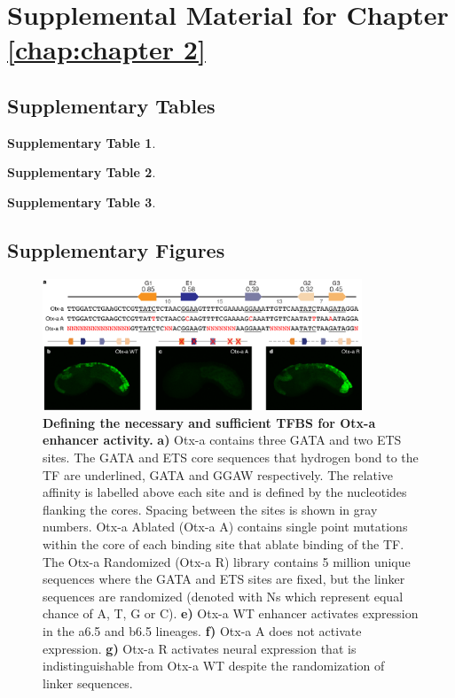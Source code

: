 \chapter{Supplemental Material for Chapter \ref{chap:chapter 2}}

\section{Supplementary Tables}

\noindent
\textbf{Supplementary Table 1}.

\noindent
\textbf{Supplementary Table 2}.

\noindent
\textbf{Supplementary Table 3}.

\section{Supplementary Figures}

\begin{figure}[p]
    \centering
    \includegraphics[width=0.85\textwidth]{2_figures-and-files/SuppFig1.png}
    \caption[Defining the necessary and sufficient TFBS for Otx-a enhancer activity.]{\textbf{Defining the necessary and sufficient TFBS for Otx-a enhancer activity.} \textbf{a)} Otx-a contains three GATA and two ETS sites. The GATA and ETS core sequences that hydrogen bond to the TF are underlined, GATA and GGAW respectively. The relative affinity is labelled above each site and is defined by the nucleotides flanking the cores. Spacing between the sites is shown in gray numbers. Otx-a Ablated (Otx-a A) contains single point mutations within the core of each binding site that ablate binding of the TF. The Otx-a Randomized (Otx-a R) library contains 5 million unique sequences where the GATA and ETS sites are fixed, but the linker sequences are randomized (denoted with Ns which represent equal chance of A, T, G or C). \textbf{e)} Otx-a WT enhancer activates expression in the a6.5 and b6.5 lineages. \textbf{f)} Otx-a A does not activate expression. \textbf{g)} Otx-a R activates neural expression that is indistinguishable from Otx-a WT despite the randomization of linker sequences.}
    \label{fig:2 supplementary_1}
\end{figure}


